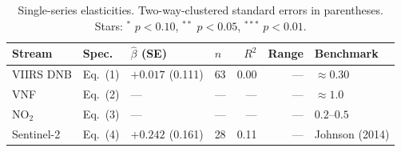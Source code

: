 \begin{table}[H]
\centering\small
\caption{Single-series elasticities. Two-way-clustered standard errors in parentheses. Stars: $^{*}$ $p<0.10$, $^{**}$ $p<0.05$, $^{***}$ $p<0.01$.}
\label{tab:elasticities}
\begin{tabular}{llllrrl}
\toprule
Stream & Spec. & $\hat\beta$ (SE) & $n$ & $R^2$ & Range & Benchmark \\
\midrule
VIIRS DNB & Eq.~(1) & $+0.017^{}$ (0.111) & 63 & 0.00 & --- & \citet{hsw2012} $\approx 0.30$ \\
VNF & Eq.~(2) & --- & --- & --- & --- & \citet{do_etal2018} $\approx 1.0$ \\
NO$_2$ & Eq.~(3) & --- & --- & --- & --- & \citet{bauwens2020} $0.2$--$0.5$ \\
Sentinel-2 & Eq.~(4) & $+0.242^{}$ (0.161) & 28 & 0.11 & --- & Johnson (2014) \\
\bottomrule
\end{tabular}
\end{table}